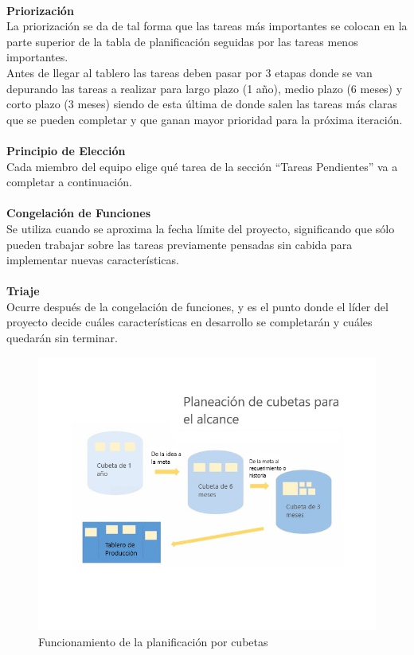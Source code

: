 \documentclass[12pt, a4paper, titlepage]{report}
\begin{document}
	    \\
	     \textbf{Priorización}\\
	    La priorización se da de tal forma que las tareas más importantes se colocan en la parte superior de la tabla de planificación seguidas por las tareas menos importantes.\\
	    Antes de llegar al tablero las tareas deben pasar por 3 etapas donde se van depurando las tareas a realizar para largo plazo (1 año), medio plazo (6 meses) y corto plazo (3 meses) siendo de esta última de donde salen las tareas más claras que se pueden completar y que ganan mayor prioridad para la próxima iteración.\\
	    \\
	     \textbf{Principio de Elección}\\
	    Cada miembro del equipo elige qué tarea de la sección “Tareas Pendientes” va a completar a continuación.\\
	    \\
	     \textbf{Congelación de Funciones}\\
	    Se utiliza cuando se aproxima la fecha límite del proyecto, significando que sólo pueden trabajar sobre las tareas previamente pensadas sin cabida para implementar nuevas características.\\
	    \\
	     \textbf{Triaje}\\
	    Ocurre después de la congelación de funciones, y es el punto donde el líder del proyecto decide cuáles características en desarrollo se completarán y cuáles quedarán sin terminar.\\
	    
	    \begin{figure}[H] 
	    	\includegraphics[width=12cm]{./imagenes/Introduccion/scrumban_buckets.jpg}
	    	\centering \caption{Funcionamiento de la planificación por cubetas}
	    \end{figure}
	    \newpage
\end{document}
